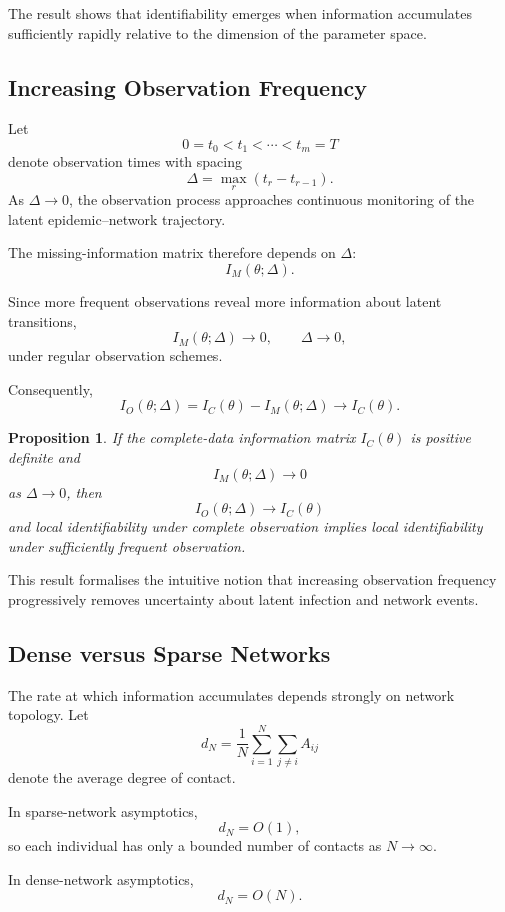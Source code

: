 \documentclass[10pt]{article}
\newtheorem{proposition}{Proposition}
\begin{document}
The result shows that identifiability emerges when information accumulates sufficiently rapidly relative to the dimension of the parameter space.

\subsection{Increasing Observation Frequency}

Let
\[
0=t_0<t_1<\cdots<t_m=T
\]
denote observation times with spacing
\[
\Delta=\max_r (t_r-t_{r-1}).
\]
As $\Delta\rightarrow0$, the observation process approaches continuous monitoring of the latent epidemic--network trajectory.

The missing-information matrix therefore depends on $\Delta$:
\[
I_M(\theta;\Delta).
\]

Since more frequent observations reveal more information about latent transitions,
\[
I_M(\theta;\Delta)
\rightarrow 0,
\qquad
\Delta\rightarrow0,
\]
under regular observation schemes.

Consequently,
\[
I_O(\theta;\Delta)
=
I_C(\theta)-I_M(\theta;\Delta)
\rightarrow
I_C(\theta).
\]

\begin{proposition}
If the complete-data information matrix $I_C(\theta)$ is positive definite and
\[
I_M(\theta;\Delta)\rightarrow0
\]
as $\Delta\rightarrow0$, then
\[
I_O(\theta;\Delta)
\rightarrow
I_C(\theta)
\]
and local identifiability under complete observation implies local identifiability under sufficiently frequent observation.
\end{proposition}

This result formalises the intuitive notion that increasing observation frequency progressively removes uncertainty about latent infection and network events.

\subsection{Dense versus Sparse Networks}

The rate at which information accumulates depends strongly on network topology. Let
\[
d_N
=
\frac{1}{N}
\sum_{i=1}^{N}
\sum_{j\neq i}
A_{ij}
\]
denote the average degree of contact.

In sparse-network asymptotics,
\[
d_N=O(1),
\]
so each individual has only a bounded number of contacts as $N\rightarrow\infty$.

In dense-network asymptotics,
\[
d_N=O(N).
\]
\end{document}
